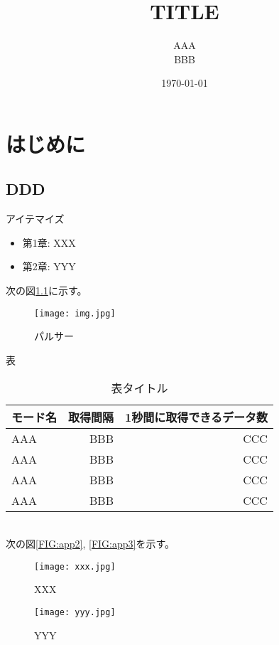 \documentclass[a4paper,12pt,uplatex]{jsreport}
\title{TITLE}
\author{AAA\\BBB}
\date{\today}
\begin{document}
\maketitle
\tableofcontents

\chapter{はじめに}
\section{DDD}

アイテマイズ
\begin{itemize}
	\item 第1章: XXX
	\item 第2章: YYY
\end{itemize}


次の図\ref{FIG:p1}に示す。
\begin{figure}[h]
	\fontsize{12pt}{0cm}\selectfont
	\centering
	\renewcommand{\figurename}{図}
	\texttt{[image: img.jpg]}
	\caption{パルサー}
	\label{FIG:p1}
\end{figure}

表
\begin{table}[htbp]
    \caption{表タイトル}
    \centering
    \begin{tabular}{|l||r|r|}
        \hline
        モード名 & 取得間隔 & 1秒間に取得できるデータ数\\
        \hline
        \hline
        AAA & BBB & CCC\\
        \hline
        AAA & BBB & CCC\\
        \hline
        AAA & BBB & CCC\\
        \hline
        AAA & BBB & CCC\\
        \hline
    \end{tabular}
    \label{TB:1}
\end{table}\\


次の図\ref{FIG:app2}, \ref{FIG:app3}を示す。\\
\begin{figure}[htbp]
	\begin{minipage}[b]{0.45\linewidth}
		\centering
		\texttt{[image: xxx.jpg]}
		\caption{XXX}
		\label{FIG:yyy}
	\end{minipage}
	\begin{minipage}[b]{0.45\linewidth}
		\centering
		\texttt{[image: yyy.jpg]}
		\caption{YYY}
		\label{FIG:xxx}
	\end{minipage}
\end{figure}\\
\end{document}
